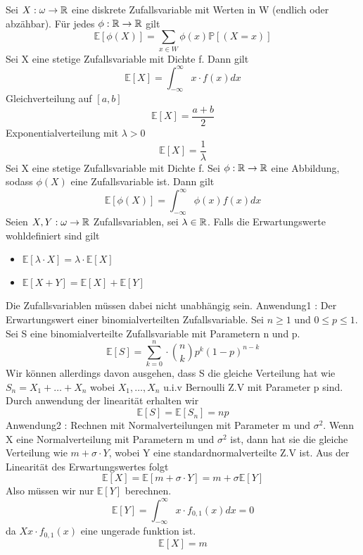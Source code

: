 \Satz[4.7] Sei \( X: \omega \rightarrow \mathbb{R} \) eine diskrete Zufallsvariable mit Werten in W (endlich oder abzähbar). Für jedes \(\phi : \mathbb{R} \rightarrow \mathbb{R} \) gilt \[ \mathbb{E}[\phi(X)] = \sum_{x \in W} \phi(x) \mathbb{P}[(X = x)]\]
\Satz[4.8] Sei X eine stetige Zufallsvariable mit Dichte f. Dann gilt \[\mathbb{E}[X] = \int_{-\infty}^{\infty} x \cdot f(x)dx\]
\Bsp[4.8A] Gleichverteilung auf \([a,b]\) \[\mathbb{E}[X] = \frac{a + b}{2}\] Exponentialverteilung mit \( \lambda > 0 \) \[\mathbb{E}[X] = \frac{1}{\lambda}\]
\Theo[4.9] Sei X eine stetige Zufallsvariable mit Dichte f. Sei \(\phi : \mathbb{R} \rightarrow \mathbb{R} \) eine Abbildung, sodass \( \phi(X )\) eine Zufallsvariable ist. Dann gilt \[ \mathbb{E}[\phi(X)] = \int_{-\infty}^{\infty} \phi(x)f(x)dx\]
 \newline
Seien \(X, Y : \omega \rightarrow \mathbb{R} \) Zufallsvariablen, sei \(\lambda \in \mathbb{R}\). Falls die Erwartungswerte wohldefiniert sind gilt \begin{itemize}
    \item \(\mathbb{E}[ \lambda \cdot X ] = \lambda \cdot \mathbb{E}[X]\)
    \item \(\mathbb{E}[X + Y] = \mathbb{E}[X] + \mathbb{E}[Y]\)
\end{itemize}
\Bem[4.11] \newline 
Die Zufallsvariablen müssen dabei nicht unabhängig sein. \newline
\Bem[4.12] \newline
Anwendung1 : Der Erwartungswert einer binomialverteilten Zufallsvariable. Sei \( n \geq 1\) und \( 0 \leq p \leq 1 \). Sei S eine binomialverteilte Zufallsvariable mit Parametern n und p. \[\mathbb{E}[S] = \sum_{k=0}^{n} \cdot \binom{n}{k} p^k (1-p)^{n-k}\]
Wir können allerdings davon ausgehen, dass S die gleiche Verteilung hat wie \(S_n = X_1 + \dots + X_n\) wobei \(X_1 , \dots , X_n \) u.i.v Bernoulli Z.V mit Parameter p sind. Durch anwendung der linearität erhalten wir \[ \mathbb{E}[S] = \mathbb{E}[S_n] = np\]
Anwendung2 : Rechnen mit Normalverteilungen mit Parameter m und \( \sigma^2\). Wenn X eine Normalverteilung mit Parametern m und \( \sigma^2\) ist, dann hat sie die gleiche Verteilung wie \( m + \sigma \cdot Y\), wobei Y eine standardnormalverteilte Z.V ist. Aus der Linearität des Erwartungswertes folgt \[ \mathbb{E}[X] = \mathbb{E}[m + \sigma \cdot Y] = m + \sigma \mathbb{E}[Y]\] Also müssen wir nur \( \mathbb{E}[Y]\) berechnen. \[\mathbb{E}[Y] = \int_{-\infty}^{\infty} x \cdot f_{0,1}(x) dx = 0\] da \(X x \cdot f_{0,1}(x)\) eine ungerade funktion ist. \[\mathbb{E}[X] = m\]
